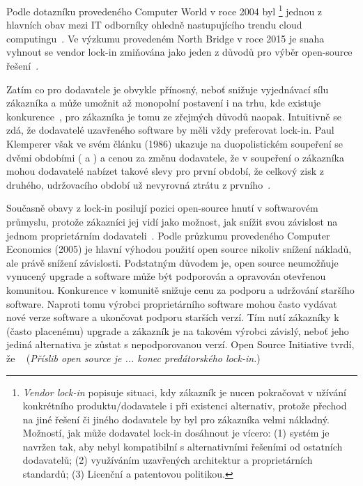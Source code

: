 \begin{multicols}{2}
	Podle dotazníku provedeného Computer World v roce 2004 byl \footnote{{\em Vendor lock-in} popisuje situaci, kdy zákazník je nucen pokračovat v užívání konkrétního produktu/dodavatele i při existenci alternativ, protože přechod na jiné řešení či jiného dodavatele by byl pro zákazníka velmi nákladný. Možností, jak může dodavatel lock-in dosáhnout je vícero: (1) systém je navržen tak, aby nebyl kompatibilní s alternativními řešeními od ostatních dodavatelů; (2) využíváním uzavřených architektur a proprietárních standardů; (3) Licenční a patentovou politikou.} jednou z hlavních obav mezi IT odborníky ohledně nastupujícího trendu cloud computingu~\cite{computer-world-2004}. Ve výzkumu provedeném North Bridge v roce 2015 je snaha vyhnout se vendor lock-in zmiňována jako jeden z důvodů pro výběr open-source řešení~\cite{survey-2015}.

	Zatím co pro dodavatele je  obvykle přínosný, neboť snižuje
	vyjednávací sílu zákazníka a může umožnit až monopolní postavení i na trhu,
	kde existuje konkurence~\cite[str. 1]{lock-in-competition}, pro zákazníka
	je tomu ze zřejmých důvodů naopak. Intuitivně se zdá, že dodavatelé
	uzavřeného software by měli vždy preferovat lock-in. Paul Klemperer však ve
	svém článku (1986) ukazuje na duopolistickém soupeření se dvěmi obdobími
	( a ) a cenou za změnu dodavatele, že v soupeření o zákazníka mohou dodavatelé nabízet takové slevy pro první období, že celkový zisk z druhého, udržovacího období už nevyrovná ztrátu z prvního~\cite{klemperer-switching-costs,lock-in-competition}.

	Současně obavy z lock-in posilují pozici open-source hnutí v softwarovém průmyslu, protože zákazníci jej vidí jako možnost, jak snížit svou závislost na jednom proprietárním dodavateli~\cite{opensource-advantage}. Podle průzkumu provedeného Computer Economics (2005) je hlavní výhodou použití open source nikoliv snížení nákladů, ale právě snížení závislosti. Podstatným důvodem je, open source neumožňuje vynucený upgrade a software může být podporován a opravován otevřenou komunitou. Konkurence v komunitě snižuje cenu za podporu a udržování staršího software. Naproti tomu výrobci proprietárního software mohou často vydávat nové verze software a ukončovat podporu starších verzí. Tím nutí zákazníky k (často placenému) upgrade a zákazník je na takovém výrobci závislý, neboť jeho jediná alternativa je zůstat s nepodporovanou verzí. Open Source Initiative tvrdí, že ~\cite{OSI} ({\em Příslib open source je ... konec predátorského lock-in.})


\end{multicols}

